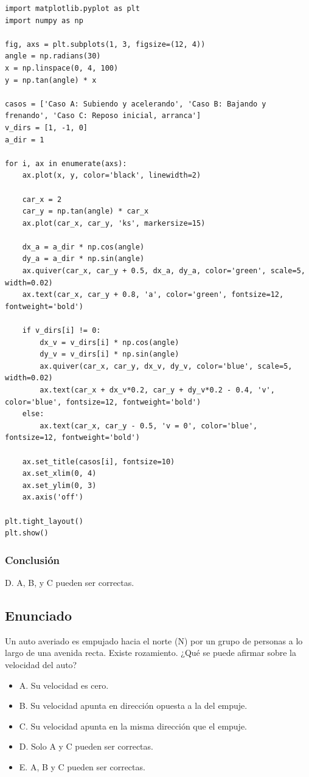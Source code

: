 \documentclass[12pt, a4paper]{article}
\begin{document}
\begin{lstlisting}
import matplotlib.pyplot as plt
import numpy as np

fig, axs = plt.subplots(1, 3, figsize=(12, 4))
angle = np.radians(30)
x = np.linspace(0, 4, 100)
y = np.tan(angle) * x

casos = ['Caso A: Subiendo y acelerando', 'Caso B: Bajando y frenando', 'Caso C: Reposo inicial, arranca']
v_dirs = [1, -1, 0]
a_dir = 1 

for i, ax in enumerate(axs):
    ax.plot(x, y, color='black', linewidth=2)
    
    car_x = 2
    car_y = np.tan(angle) * car_x
    ax.plot(car_x, car_y, 'ks', markersize=15)
    
    dx_a = a_dir * np.cos(angle)
    dy_a = a_dir * np.sin(angle)
    ax.quiver(car_x, car_y + 0.5, dx_a, dy_a, color='green', scale=5, width=0.02)
    ax.text(car_x, car_y + 0.8, 'a', color='green', fontsize=12, fontweight='bold')
    
    if v_dirs[i] != 0:
        dx_v = v_dirs[i] * np.cos(angle)
        dy_v = v_dirs[i] * np.sin(angle)
        ax.quiver(car_x, car_y, dx_v, dy_v, color='blue', scale=5, width=0.02)
        ax.text(car_x + dx_v*0.2, car_y + dy_v*0.2 - 0.4, 'v', color='blue', fontsize=12, fontweight='bold')
    else:
        ax.text(car_x, car_y - 0.5, 'v = 0', color='blue', fontsize=12, fontweight='bold')
        
    ax.set_title(casos[i], fontsize=10)
    ax.set_xlim(0, 4)
    ax.set_ylim(0, 3)
    ax.axis('off')

plt.tight_layout()
plt.show()
\end{lstlisting}

\subsubsection*{Conclusión}

D. A, B, y C pueden ser correctas.

\newpage
\subsection*{Enunciado}

Un auto averiado es empujado hacia el norte (N) por un grupo de personas a lo largo de una avenida recta. Existe rozamiento. ¿Qué se puede afirmar sobre la velocidad del auto?

\begin{itemize}
    \item A. Su velocidad es cero.
    \item B. Su velocidad apunta en dirección opuesta a la del empuje.
    \item C. Su velocidad apunta en la misma dirección que el empuje.
    \item D. Solo A y C pueden ser correctas.
    \item E. A, B y C pueden ser correctas.
\end{itemize}
\end{document}
